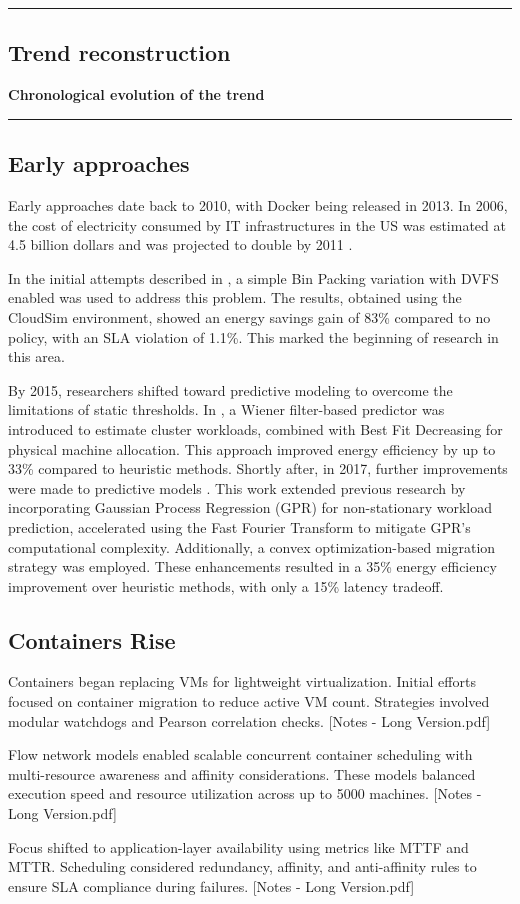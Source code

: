 {\color{gray}\hrule}
\begin{center}
\section{Trend reconstruction}
\textbf{Chronological evolution of the trend}
\bigskip
\end{center}
{\color{gray}\hrule}
\begin{multicols}{2}
\subsection{Early approaches}
Early approaches date back to 2010, with Docker being released in 2013. In 2006, the cost of electricity consumed by IT infrastructures in the US was estimated at 4.5 billion dollars and was projected to double by 2011 \cite{beloglazov_energy_2010}.

In the initial attempts described in \cite{beloglazov_energy_2010}, a simple Bin Packing variation with DVFS enabled was used to address this problem. The results, obtained using the CloudSim environment, showed an energy savings gain of 83\% compared to no policy, with an SLA violation of 1.1\%. This marked the beginning of research in this area.

By 2015, researchers shifted toward predictive modeling to overcome the limitations of static thresholds. In \cite{dabbagh_energy-efficient_2015},
a Wiener filter-based predictor was introduced to estimate cluster workloads, 
combined with Best Fit Decreasing for physical machine allocation.
This approach improved energy efficiency by up to 33\% compared to heuristic methods.
Shortly after, in 2017, further improvements were made to predictive models \cite{bui_energy_2017}.
This work extended previous research by incorporating Gaussian Process Regression (GPR) for non-stationary workload prediction,
accelerated using the Fast Fourier Transform to mitigate GPR's computational complexity.
Additionally, a convex optimization-based migration strategy was employed.
These enhancements resulted in a 35\% energy efficiency improvement over heuristic methods, with only a 15\% latency tradeoff.

\subsection{Containers Rise}
Containers began replacing VMs for lightweight virtualization. Initial efforts focused on container migration to reduce active VM count. Strategies involved modular watchdogs and Pearson correlation checks. [Notes - Long Version.pdf]

Flow network models enabled scalable concurrent container scheduling with multi-resource awareness and affinity considerations. These models balanced execution speed and resource utilization across up to 5000 machines. [Notes - Long Version.pdf]


Focus shifted to application-layer availability using metrics like MTTF and MTTR. Scheduling considered redundancy, affinity, and anti-affinity rules to ensure SLA compliance during failures. [Notes - Long Version.pdf]

\end{multicols}


